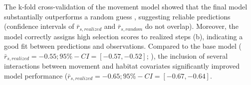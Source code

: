\documentclass[abstract=on,10pt,a4paper,bibliography=totocnumbered]{article}
\begin{document}
%
%

The k-fold cross-validation of the movement model showed that the final model
substantially outperforms a random guess , suggesting reliable predictions
(confidence intervals of \(\bar{r}_{s, realized}\) and \(\bar{r}_{s, random}\)
do not overlap). Moreover, the model correctly assigns high selection scores to
realized steps (b), indicating a good fit between
predictions and observations. Compared to the base model (\(\bar{r}_{s,
realized} = -0.55; 95\%-CI = [-0.57, -0.52]\); \citealp{Hofmann.2021}), the
inclusion of several interactions between movement and habitat covariates
significantly improved model performance (\(\bar{r}_{s, realized} = -0.65;
95\%-CI = [-0.67, -0.64]\).
\end{document}
